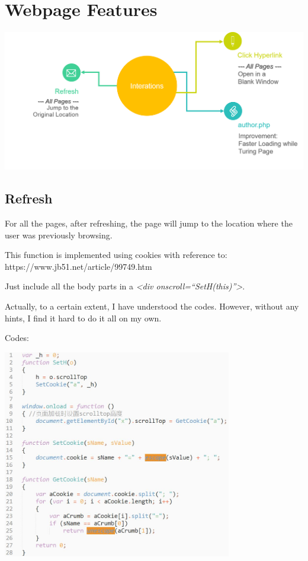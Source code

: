 \documentclass[10pt,twoside,a4paper,titlepage]{article}
\begin{document}
	\newpage

	\section{Webpage Features}
		\includegraphics[width=1\textwidth]{gzl/06.png}
	\subsection{Refresh}
		For all the pages, after refreshing, the page will jump to the location where the user was previously browsing.\par
		This function is implemented using cookies with reference to: https://www.jb51.net/article/99749.htm\par
		Just include all the body parts in a \emph{<div onscroll=“SetH(this)”>}.\par
		Actually, to a certain extent, I have understood the codes. However, without any hints, I find it hard to do it all on my own.\newline\par
		Codes:\newline\par
		\includegraphics[width=0.75\textwidth]{gzl/07.jpg}
\end{document}
